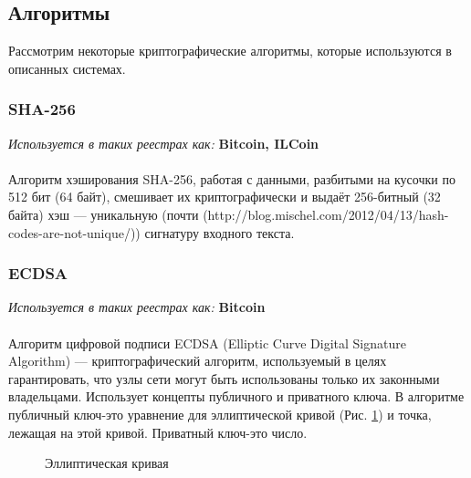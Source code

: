 \subsection{Алгоритмы}
Рассмотрим некоторые криптографические алгоритмы, которые используются в описанных системах.
\subsubsection{SHA-256}
\emph{Используется в таких реестрах как: } \textbf{Bitcoin, ILCoin}\\\\
Алгоритм хэширования SHA-256, работая с данными, разбитыми на кусочки по 512
бит (64 байт), смешивает их криптографически и выдаёт 256-битный (32 байта) хэш
--- уникальную (почти (http://blog.mischel.com/2012/04/13/hash-codes-are-not-unique/)) сигнатуру входного текста.
\subsubsection{ECDSA}
\emph{Используется в таких реестрах как: } \textbf{ Bitcoin } \\\\
Алгоритм цифровой подписи ECDSA (Elliptic Curve Digital Signature Algorithm)
--- криптографический алгоритм, используемый в целях гарантировать, что узлы
сети могут быть использованы только их законными владельцами. Использует
концепты публичного и приватного ключа. В алгоритме публичный ключ-это
уравнение для эллиптической кривой (Рис. \ref{elliptic_curve}) и точка, лежащая
на этой кривой. Приватный ключ-это число.

\begin{figure}[h]
    \centering
    \caption{Эллиптическая кривая}\label{elliptic_curve}
\end{figure}

